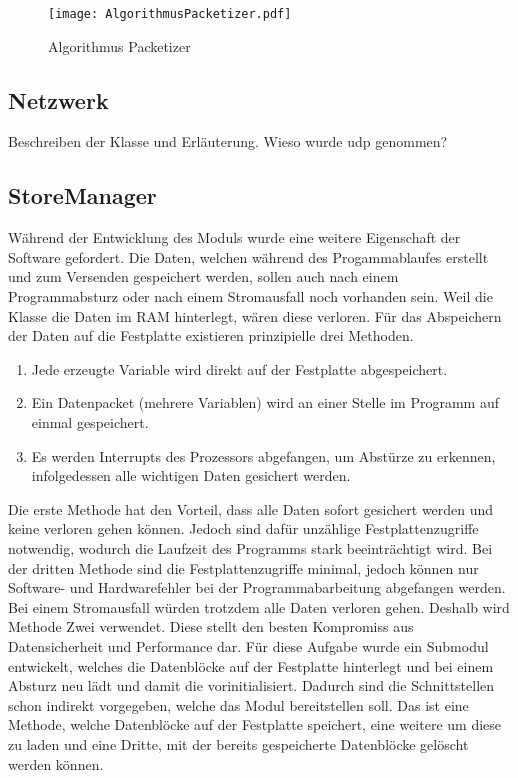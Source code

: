 \begin{figure}[H]
\centering
\texttt{[image: AlgorithmusPacketizer.pdf]}
\caption{Algorithmus Packetizer}
\label{fig:AlgorithmusPacketizer}
\end{figure}

\subsection{Netzwerk}

Beschreiben der Klasse  und Erläuterung. Wieso wurde udp
genommen?

\subsection{StoreManager}

Während der Entwicklung des Moduls  wurde eine weitere Eigenschaft
der Software gefordert.
Die Daten, welchen während des Progammablaufes erstellt und zum Versenden
gespeichert werden, sollen auch nach einem Programmabsturz oder nach einem
Stromausfall noch vorhanden sein. Weil die Klasse 
die Daten im RAM hinterlegt, wären diese verloren.
Für das Abspeichern der Daten auf die Festplatte existieren prinzipielle drei Methoden.

\begin{enumerate}
\item Jede erzeugte Variable wird direkt auf der Festplatte abgespeichert.
\item Ein Datenpacket (mehrere Variablen) wird an einer Stelle im Programm auf
einmal gespeichert.
\item Es werden Interrupts des Prozessors abgefangen, um Abstürze zu erkennen,
infolgedessen alle wichtigen Daten gesichert werden.
\end{enumerate}

Die erste Methode hat den Vorteil, dass alle Daten sofort gesichert werden und
keine verloren gehen können. Jedoch sind dafür unzählige Festplattenzugriffe
notwendig, wodurch die Laufzeit des Programms stark beeinträchtigt wird. Bei der
dritten Methode sind die Festplattenzugriffe minimal, jedoch können nur
Software- und Hardwarefehler bei der Programmabarbeitung abgefangen werden. Bei
einem Stromausfall würden trotzdem alle Daten verloren gehen. Deshalb wird
Methode Zwei verwendet. Diese stellt den besten Kompromiss aus Datensicherheit
und Performance dar. \newline
Für diese Aufgabe wurde ein Submodul entwickelt, welches die Datenblöcke auf
der Festplatte hinterlegt und bei einem Absturz neu lädt und damit die
 vorinitialisiert. Dadurch sind die Schnittstellen schon indirekt
vorgegeben, welche das Modul bereitstellen soll. Das ist eine Methode,
welche Datenblöcke auf der Festplatte speichert, eine weitere um diese zu laden
und eine Dritte, mit der bereits gespeicherte Datenblöcke gelöscht werden
können.

